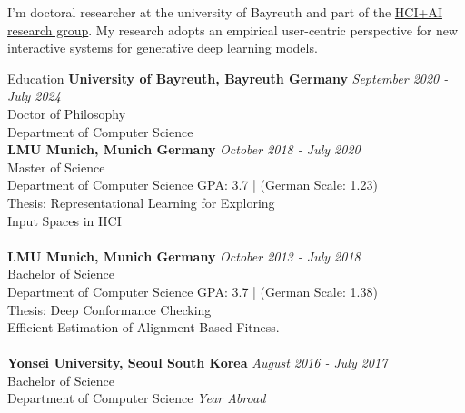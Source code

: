 \documentclass{resume} %
\begin{document}
I'm doctoral researcher at the university of Bayreuth and part of the \href{https://www.hciai.uni-bayreuth.de/en/index.html}{HCI+AI research group}.
My research adopts an empirical user-centric perspective for new interactive systems for generative deep learning models.


\begin{rSection}{Education}
{\bf University of Bayreuth, Bayreuth Germany } \hfill {\em September 2020 - July 2024} 
\\ Doctor of Philosophy
\\ Department of Computer Science \\
{\bf LMU Munich, Munich Germany } \hfill {\em October 2018 - July 2020} 
\\ Master of Science
\\ Department of Computer Science \hfill { GPA: 3.7 | (German Scale: 1.23) }
\\ Thesis: Representational Learning for Exploring\\Input Spaces in HCI\\
\\{\bf LMU Munich, Munich Germany} \hfill {\em October 2013 - July 2018} 
\\ Bachelor of Science
\\ Department of Computer Science \hfill { GPA: 3.7 | (German Scale: 1.38)}
\\ Thesis: Deep Conformance Checking \\ Efficient Estimation of Alignment Based Fitness.\\
\\{\bf Yonsei University, Seoul South Korea} \hfill {\em August 2016 - July 2017} 
\\ Bachelor of Science
\\ Department of Computer Science \hfill {\em Year Abroad} 

\end{rSection}

\end{document}
